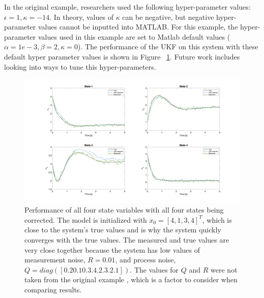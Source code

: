 \noindent In the original example, researchers used the following hyper-parameter values: $\epsilon = 1, \kappa = -14$. In theory, values of $\kappa$ can be negative, but negative hyper-parameter values cannot be inputted into MATLAB. For this example, the hyper-parameter values used in this example are set to Matlab default values ($\alpha = 1e-3, \beta = 2, \kappa = 0$). The performance of the UKF on this system with these default hyper parameter values is shown in Figure ~\ref{fig:UKF_states}. Future work includes looking into ways to tune this hyper-parameters. \\


\begin{figure}[ht]
    \centering
    \includegraphics[scale = 0.3]{UKF_states.png}
    \caption{Performance of all four state variables with all four states being corrected. The model is initialized with $x_0 = [4, 1, 3, 4]^T$, which is close to the system's true values and is why the system quickly converges with the true values. The measured and true values are very close together because the system has low values of measurement noise, $R=0.01$, and process noise, $Q=diag([0.2 0.1 0.3 .4 .2 .3 .2 .1])$. The values for $Q$ and $R$ were not taken from the original example \cite{article5}, which is a factor to consider when comparing results.}
    \label{fig:UKF_states}
\end{figure}


